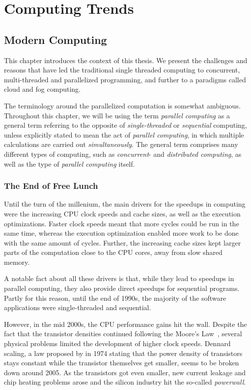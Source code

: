 \chapter{Computing Trends}
\label{chapter:computing-trends}

\section{Modern Computing}
This chapter introduces the context of this thesis. We present the challenges and reasons that have led the traditional single threaded computing to concurrent, multi-threaded and parallelized programming, and further to a paradigms called cloud and fog computing.

The terminology around the parallelized computation is somewhat ambiguous. Throughout this chapter, we will be using the term \emph{parallel computing} as a general term referring to the opposite of \emph{single-threaded} or \emph{sequential} computing, unless explicitly stated to mean the act of \emph{parallel computing}, in which multiple calculations are carried out \emph{simultaneously}. The general term comprises many different types of computing, such as \emph{concurrent}- and \emph{distributed computing}, as well as the type of \emph{parallel computing} itself.

\subsection{The End of Free Lunch}
\label{subsection:the-end-of-free-lunch}
Until the turn of the millenium, the main drivers for the speedups in computing were the increasing  CPU clock speeds and cache sizes, as well as the execution optimizations. Faster clock speeds meant that more cycles could be run in the same time, whereas the execution optimization enabled more work to be done with the same amount of cycles. Further, the increasing cache sizes kept larger parts of the computation close to the CPU cores, away from slow shared memory.~\cite{Sutter:2005:FLiO}

A notable fact about all these drivers is that, while they lead to speedups in parallel computing, they also provide direct speedups for sequential programs. Partly for this reason, until the end of 1990s, the majority of the software applications were single-threaded and sequential.~\cite{Sutter:2005:FLiO}

However, in the mid 2000s, the CPU performance gains hit the wall. Despite the fact that the transistor densities continued following the Moore's Law~\cite{Moore:1998:MooresLaw}, several physical problems limited the development of higher clock speeds. Dennard scaling, a law proposed by in 1974 stating that the power density of transistors stays constant while the transistor themselves get smaller, seems to be broken down around 2005. As the transistors got even smaller, new current leakage and chip heating problems arose and the silicon industry hit the so-called \emph{powerwall}.~\cite{Esmaeilzadeh:2011:DSE, Sutter:2005:FLiO}


